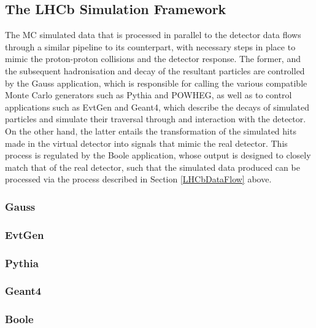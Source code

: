 \subsection{The LHCb Simulation Framework}
The MC simulated data that is processed in parallel to the detector data flows through a similar pipeline to its counterpart, with necessary steps in place to mimic the proton-proton collisions and the detector response. The former, and the subsequent hadronisation and decay of the resultant particles 
are controlled by the Gauss application, which is responsible for calling the various compatible Monte Carlo generators such as Pythia and POWHEG, as well as to control applications such as EvtGen and Geant4, which describe the decays of simulated particles and simulate their traversal through and interaction with
the detector. On the other hand, the latter entails the transformation of the simulated hits made in the virtual detector into signals that mimic the real detector. This process is regulated by the Boole application, whose output is designed to closely match that of the real detector, such that the simulated data produced can be 
processed via the process described in Section \ref{LHCbDataFlow} above. 
\subsubsection{Gauss}
\subsubsection{EvtGen}
\subsubsection{Pythia}
\subsubsection{Geant4}
\subsubsection{Boole} 



